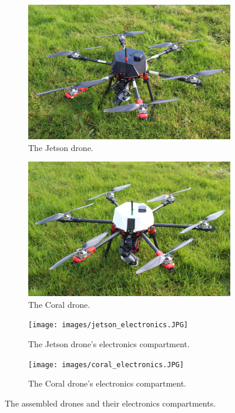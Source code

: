 \begin{figure}
    \begin{subfigure}[b]{0.48\textwidth}
        \centering
        \includegraphics[width=\textwidth]{images/jetson_drone.JPG}
        \caption{The Jetson drone.}
        \label{fig:jetson_drone}
    \end{subfigure}
    \begin{subfigure}[b]{0.48\textwidth}
        \centering
        \includegraphics[width=\textwidth]{images/coral_drone.JPG}
        \caption{The Coral drone.}
        \label{fig:coral_drone}
    \end{subfigure}
    
    \begin{subfigure}[b]{0.48\textwidth}
        \centering
        \texttt{[image: images/jetson\_electronics.JPG]}
        \caption{The Jetson drone's electronics compartment.}
        \label{fig:jetson_electronics}
    \end{subfigure}
    \begin{subfigure}[b]{0.48\textwidth}
        \centering
        \texttt{[image: images/coral\_electronics.JPG]}
        \caption{The Coral drone's electronics compartment.}
        \label{fig:coral_electronics}
    \end{subfigure}
    
    \caption{The assembled drones and their electronics compartments.}
    \label{fig:drone_pictures}
\end{figure}